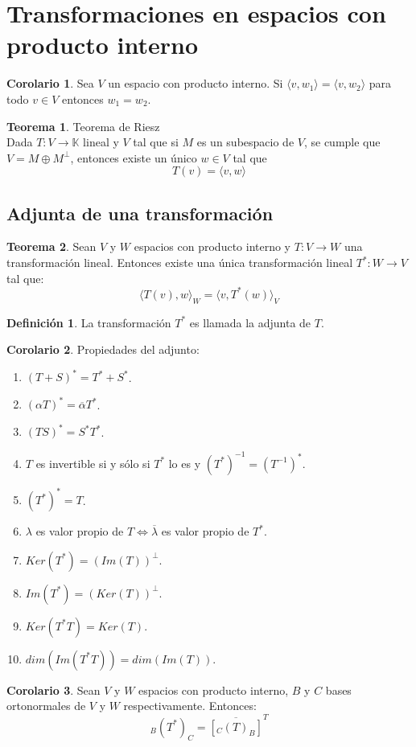 \documentclass[10pt]{article}
\theoremstyle{definition}
\newtheorem{definition}{Definición}[section]
\newtheorem{theorem}{Teorema}[section]
\newtheorem{corollary}{Corolario}[theorem]
\begin{document}
\section{Transformaciones en espacios con producto interno}
\begin{corollary}
	Sea $V$ un espacio con producto interno. Si $\langle v,w_1\rangle=\langle v,w_2\rangle$ para todo $v\in V$ entonces $w_1=w_2$.
\end{corollary}
\begin{theorem}{Teorema de Riesz}
	\\Dada $T:V\to\mathbb{K}$ lineal y $V$ tal que si $M$ es un subespacio de $V$, se cumple que $V=M\oplus M^\bot$, entonces existe un único $w\in V$ tal que $$T(v)=\langle v,w\rangle$$
\end{theorem}
\subsection{Adjunta de una transformación}
\begin{theorem}
	Sean $V$ y $W$ espacios con producto interno y $T:V\to W$ una transformación lineal. Entonces existe una única transformación lineal $T^*:W\to V$ tal que: $$\langle T(v),w\rangle_W=\langle v,T^*(w)\rangle_V$$
\end{theorem}
\begin{definition}
	La transformación $T^*$ es llamada la adjunta de $T$.
\end{definition}
\begin{corollary}
	Propiedades del adjunto:
	\begin{enumerate}
		\item $(T+S)^*=T^*+S^*$.
		\item $(\alpha T)^*=\overline{\alpha}T^*$.
		\item $(TS)^*=S^*T^*$.
		\item $T$ es invertible si y sólo si $T^*$ lo es y $(T^*)^{-1}=(T^{-1})^*$.
		\item $(T^*)^*=T$.
		\item $\lambda$ es valor propio de $T\Leftrightarrow\overline{\lambda}$ es valor propio de $T^*$.
		\item $Ker(T^*)=(Im(T))^\bot$.
		\item $Im(T^*)=(Ker(T))^\bot$.
		\item $Ker(T^*T)=Ker(T)$.
		\item $dim(Im(T^*T))=dim(Im(T))$.
	\end{enumerate}
\end{corollary}
\begin{corollary}
	Sean $V$ y $W$ espacios con producto interno, $B$ y $C$ bases ortonormales de $V$ y $W$ respectivamente. Entonces:$$_B(T^*)_C=\overline{[_C(T)_B]}^T$$
\end{corollary}
\end{document}
